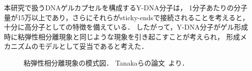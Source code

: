 本研究で扱うDNAゲルカプセルを構成するY-DNA分子は，
1分子あたりの分子量が15万以上であり，さらにそれらがsticky-endsで接続されることを考えると，
十分に高分子としての特徴を備えている．
したがって，Y-DNA分子がゲル形成時に粘弾性相分離現象と同じような現象を引き起こすことが考えられ，
形成メカニズムのモデルとして妥当であると考えた．

\begin{figure}
\centering

\caption{
    粘弾性相分離現象の模式図．
    Tanakaらの論文~\cite{tanaka2009formation}より．
}

\label{fig:veps}
\end{figure}
